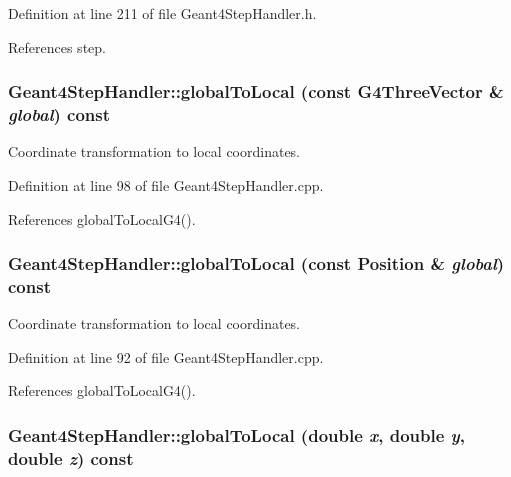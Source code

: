 Definition at line 211 of file Geant4StepHandler.h.

References step.\hypertarget{class_d_d4hep_1_1_simulation_1_1_geant4_step_handler_a90c665198f858b7bc5989b7cd92fe774}{
\subsubsection[{globalToLocal}]{ Geant4StepHandler::globalToLocal (const G4ThreeVector \& {\em global}) const}}
\label{class_d_d4hep_1_1_simulation_1_1_geant4_step_handler_a90c665198f858b7bc5989b7cd92fe774}


Coordinate transformation to local coordinates. 

Definition at line 98 of file Geant4StepHandler.cpp.

References globalToLocalG4().\hypertarget{class_d_d4hep_1_1_simulation_1_1_geant4_step_handler_ab13cf409429a7de0f2ecec3b4c944578}{
\subsubsection[{globalToLocal}]{ Geant4StepHandler::globalToLocal (const {\bf Position} \& {\em global}) const}}
\label{class_d_d4hep_1_1_simulation_1_1_geant4_step_handler_ab13cf409429a7de0f2ecec3b4c944578}


Coordinate transformation to local coordinates. 

Definition at line 92 of file Geant4StepHandler.cpp.

References globalToLocalG4().\hypertarget{class_d_d4hep_1_1_simulation_1_1_geant4_step_handler_af8c0b11ac1954f94db1e3bd785c76227}{
\subsubsection[{globalToLocal}]{ Geant4StepHandler::globalToLocal (double {\em x}, \/  double {\em y}, \/  double {\em z}) const}}
\label{class_d_d4hep_1_1_simulation_1_1_geant4_step_handler_af8c0b11ac1954f94db1e3bd785c76227}


